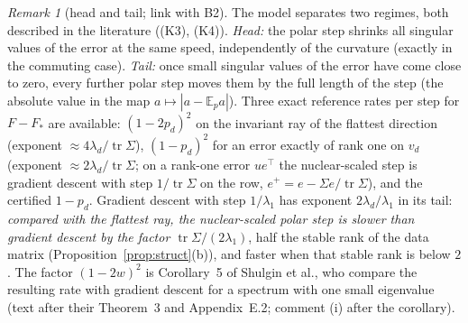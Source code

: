 \documentclass[11pt]{article}
\theoremstyle{definition}
\theoremstyle{remark}
\newtheorem{remark}[theorem]{Remark}
\newcommand{\E}{\mathbb{E}}
\newcommand{\abs}[1]{\left|#1\right|}
\newcommand{\tr}{\operatorname{tr}}
\begin{document}
\begin{remark}[head and tail; link with B2]\label{rem:headtail}
The model separates two regimes, both described in the literature ((K3), (K4)). \emph{Head:} the polar step shrinks
all singular values of the error at the same speed, independently of the curvature (exactly in the commuting case).
\emph{Tail:} once small singular values of the error have come close to zero, every further polar step moves them by
the full length of the step (the absolute value in the map $a\mapsto\abs{a-\E_pa}$). Three exact reference rates per
step for $F-F_\ast$ are available: $(1-2p_d)^2$ on the invariant ray of the flattest direction (exponent
$\approx4\lambda_d/\tr\Sigma$), $(1-p_d)^2$ for an error exactly of rank one on $v_d$ (exponent
$\approx2\lambda_d/\tr\Sigma$; on a rank-one error $ue^\top$ the nuclear-scaled step is gradient descent with step
$1/\tr\Sigma$ on the row, $e^+=e-\Sigma e/\tr\Sigma$), and the certified $1-p_d$. Gradient descent with step $1/\lambda_1$ has exponent $2\lambda_d/\lambda_1$ in its tail: \emph{compared with
the flattest ray, the nuclear-scaled polar step is slower than gradient descent by the factor
$\tr\Sigma/(2\lambda_1)$}, half the stable rank of the data matrix (Proposition~\ref{prop:struct}(b)), and faster when
that stable rank is below $2$. The factor $(1-2w)^2$ is Corollary~5 of Shulgin et al., who compare the resulting rate
with gradient descent for a spectrum with one small eigenvalue (text after their Theorem~3 and Appendix~E.2; comment
(i) after the corollary).


\end{remark}
\end{document}
